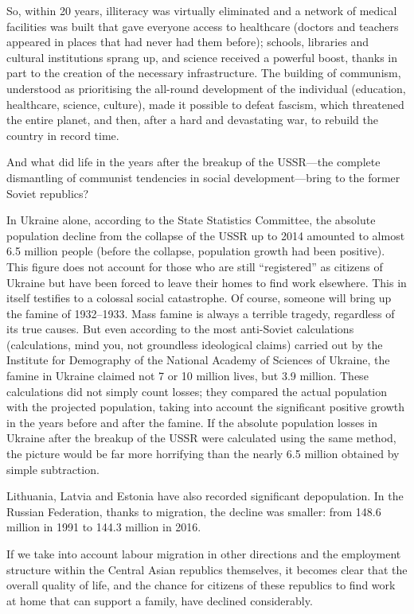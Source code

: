 \documentclass[../main]{subfiles}
\begin{document}
So, within 20 years, illiteracy was virtually eliminated and a network of medical facilities was built that gave everyone access to healthcare (doctors and teachers appeared in places that had never had them before); schools, libraries and cultural institutions sprang up, and science received a powerful boost, thanks in part to the creation of the necessary infrastructure. The building of communism, understood as prioritising the all-round development of the individual (education, healthcare, science, culture), made it possible to defeat fascism, which threatened the entire planet, and then, after a hard and devastating war, to rebuild the country in record time.

And what did life in the years after the breakup of the USSR—the complete dismantling of communist tendencies in social development—bring to the former Soviet republics?

In Ukraine alone, according to the State Statistics Committee, the absolute population decline from the collapse of the USSR up to 2014 amounted to almost 6.5 million people (before the collapse, population growth had been positive). This figure does not account for those who are still “registered” as citizens of Ukraine but have been forced to leave their homes to find work elsewhere. This in itself testifies to a colossal social catastrophe. Of course, someone will bring up the famine of 1932–1933. Mass famine is always a terrible tragedy, regardless of its true causes. But even according to the most anti-Soviet calculations (calculations, mind you, not groundless ideological claims) carried out by the Institute for Demography of the National Academy of Sciences of Ukraine, the famine in Ukraine claimed not 7 or 10 million lives, but 3.9 million. These calculations did not simply count losses; they compared the actual population with the projected population, taking into account the significant positive growth in the years before and after the famine. If the absolute population losses in Ukraine after the breakup of the USSR were calculated using the same method, the picture would be far more horrifying than the nearly 6.5 million obtained by simple subtraction.

Lithuania, Latvia and Estonia have also recorded significant depopulation. In the Russian Federation, thanks to migration, the decline was smaller: from 148.6 million in 1991 to 144.3 million in 2016.

If we take into account labour migration in other directions and the employment structure within the Central Asian republics themselves, it becomes clear that the overall quality of life, and the chance for citizens of these republics to find work at home that can support a family, have declined considerably.
\end{document}
